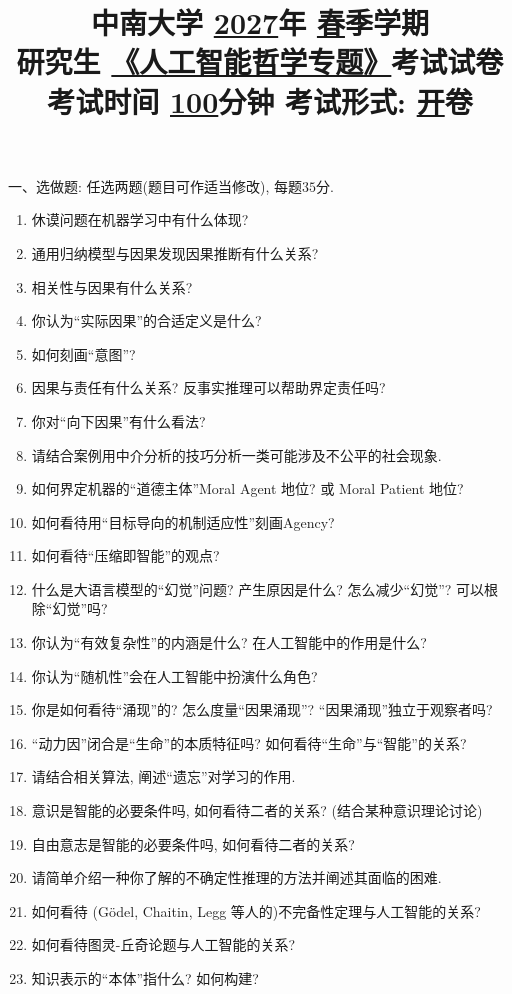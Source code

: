 \documentclass[a4paper,UTF8,12pt]{article}%
\title{\bf\LARGE
中南大学 \underline{2027}年 \underline{春}季学期\\
研究生 \underline{《人工智能哲学专题》}考试试卷\\
{\large 考试时间 \underline{100}分钟 \qquad 考试形式: \underline{开}卷}\vspace{-2.8cm}}
\author{}
\date{}
\numberwithin{equation}{section}
\begin{document}
\maketitle

一、选做题: 任选两题(题目可作适当修改), 每题$35$分.
\begin{enumerate}
 \item 休谟问题在机器学习中有什么体现? 
 \item 通用归纳模型与因果发现因果推断有什么关系? 
 \item 相关性与因果有什么关系? 
 \item 你认为``实际因果''的合适定义是什么? 
 \item 如何刻画``意图''? 
 \item 因果与责任有什么关系? 反事实推理可以帮助界定责任吗? 
 \item 你对``向下因果''有什么看法? 
 \item 请结合案例用中介分析的技巧分析一类可能涉及不公平的社会现象. 
 \item 如何界定机器的``道德主体''Moral Agent 地位? 或 Moral Patient 地位?
 \item 如何看待用``目标导向的机制适应性''刻画Agency?
 \item 如何看待``压缩即智能''的观点? 
 \item 什么是大语言模型的``幻觉''问题? 产生原因是什么? 怎么减少``幻觉''? 可以根除``幻觉''吗?
 \item 你认为``有效复杂性''的内涵是什么? 在人工智能中的作用是什么? 
 \item 你认为``随机性''会在人工智能中扮演什么角色? 
 \item 你是如何看待``涌现''的? 怎么度量``因果涌现''? ``因果涌现''独立于观察者吗? 
 \item``动力因''闭合是``生命''的本质特征吗? 如何看待``生命''与``智能''的关系? 
 \item 请结合相关算法, 阐述``遗忘''对学习的作用. 
 \item 意识是智能的必要条件吗, 如何看待二者的关系? (结合某种意识理论讨论)
 \item 自由意志是智能的必要条件吗, 如何看待二者的关系? 
 \item 请简单介绍一种你了解的不确定性推理的方法并阐述其面临的困难. 
 \item 如何看待 (G\"odel, Chaitin, Legg 等人的)不完备性定理与人工智能的关系? 
 \item 如何看待图灵-丘奇论题与人工智能的关系? 
 \item 知识表示的``本体''指什么? 如何构建? 

\end{enumerate}
\end{document}
